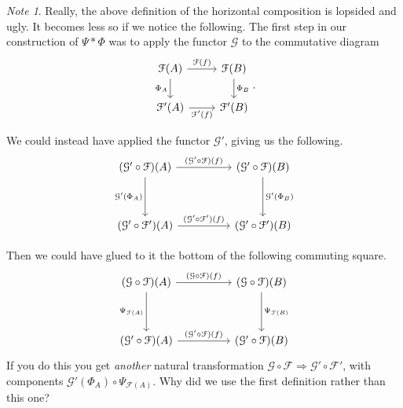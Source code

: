 \documentclass[a4paper,10pt]{scrreprt}
\theoremstyle{definition}
\theoremstyle{plain}
\theoremstyle{remark}
\newtheorem{note}{Note}[section]
\begin{document}
\begin{note}
  Really, the above definition of the horizontal composition is lopsided and ugly. It becomes less so if we notice the following. The first step in our construction of $\Psi * \Phi$ was to apply the functor $\mathcal{G}$ to the commutative diagram
  \begin{equation*}
    \begin{tikzcd}
      \mathcal{F}(A)
      \arrow[d, swap, "\Phi_{A}"] 
      \arrow[r, "\mathcal{F}(f)"] 
      & \mathcal{F}(B)
      \arrow[d, "\Phi_{B}"] 
      \\
      \mathcal{F}'(A) 
      \arrow[r, swap, "\mathcal{F}'(f)"] 
      & \mathcal{F}'(B) 
    \end{tikzcd}.
  \end{equation*}

  We could instead have applied the functor $\mathcal{G}'$, giving us the following.
  \begin{equation*}
    \begin{tikzcd}[row sep=huge, column sep=huge]
      (\mathcal{G}' \circ \mathcal{F})(A)
      \arrow[d, swap, "\mathcal{G}'(\Phi_{A})"] 
      \arrow[r, "(\mathcal{G}' \circ \mathcal{F})(f)"] 
      & (\mathcal{G}' \circ \mathcal{F})(B)
      \arrow[d, "\mathcal{G}'(\Phi_{B})"] 
      \\
      (\mathcal{G}' \circ \mathcal{F}')(A) 
      \arrow[r, "(\mathcal{G}' \circ \mathcal{F}')(f)"] 
      & (\mathcal{G}' \circ \mathcal{F}')(B) 
    \end{tikzcd}
  \end{equation*}

  Then we could have glued to it the bottom of the following commuting square.
  \begin{equation*}
    \begin{tikzcd}[row sep=huge, column sep=huge]
      (\mathcal{G} \circ \mathcal{F})(A)
      \arrow[r, "(\mathcal{G} \circ \mathcal{F})(f)"]
      \arrow[d, swap, "\Psi_{\mathcal{F}(A)}"]
      & (\mathcal{G} \circ \mathcal{F})(B)
      \arrow[d, "\Psi_{\mathcal{F}(B)}"]
      \\
      (\mathcal{G}' \circ \mathcal{F})(A)
      \arrow[r, "(\mathcal{G}' \circ \mathcal{F})(f)"]
      & (\mathcal{G}' \circ \mathcal{F})(B)
    \end{tikzcd}
  \end{equation*}
  If you do this you get \emph{another} natural transformation $\mathcal{G} \circ \mathcal{F} \Rightarrow \mathcal{G}' \circ \mathcal{F}'$, with components $\mathcal{G}'(\Phi_{A}) \circ \Psi_{\mathcal{F}(A)}$. Why did we use the first definition rather than this one? 


\end{note}
\end{document}
